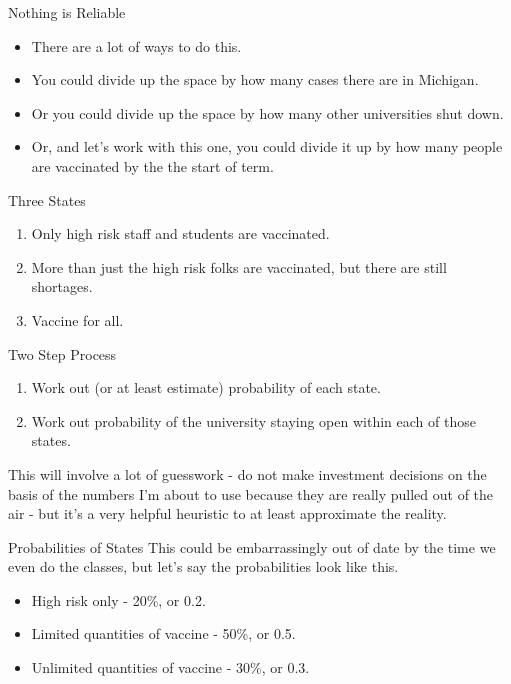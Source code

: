 \documentclass[
  ignorenonframetext,
]{beamer}
\providecommand{\tightlist}{%
  \setlength{\itemsep}{0pt}\setlength{\parskip}{0pt}}
\renewcommand{\,}{\text{, }}
\begin{document}
\begin{frame}{Nothing is Reliable}
\protect\hypertarget{nothing-is-reliable}{}
\begin{itemize}[<+->]
\tightlist
\item
  There are a lot of ways to do this.
\item
  You could divide up the space by how many cases there are in Michigan.
\item
  Or you could divide up the space by how many other universities shut
  down.
\item
  Or, and let's work with this one, you could divide it up by how many
  people are vaccinated by the the start of term.
\end{itemize}
\end{frame}

\begin{frame}{Three States}
\protect\hypertarget{three-states}{}
\begin{enumerate}
\tightlist
\item
  Only high risk staff and students are vaccinated.
\item
  More than just the high risk folks are vaccinated, but there are still
  shortages.
\item
  Vaccine for all.
\end{enumerate}
\end{frame}

\begin{frame}{Two Step Process}
\protect\hypertarget{two-step-process}{}
\begin{enumerate}
\tightlist
\item
  Work out (or at least estimate) probability of each state.
\item
  Work out probability of the university staying open within each of
  those states.
\end{enumerate}

This will involve a lot of guesswork - do not make investment decisions
on the basis of the numbers I'm about to use because they are really
pulled out of the air - but it's a very helpful heuristic to at least
approximate the reality.
\end{frame}

\begin{frame}{Probabilities of States}
\protect\hypertarget{probabilities-of-states}{}
This could be embarrassingly out of date by the time we even do the
classes, but let's say the probabilities look like this.

\begin{itemize}
\tightlist
\item
  High risk only - 20\%, or 0.2.
\item
  Limited quantities of vaccine - 50\%, or 0.5.
\item
  Unlimited quantities of vaccine - 30\%, or 0.3.
\end{itemize}
\end{frame}
\end{document}
